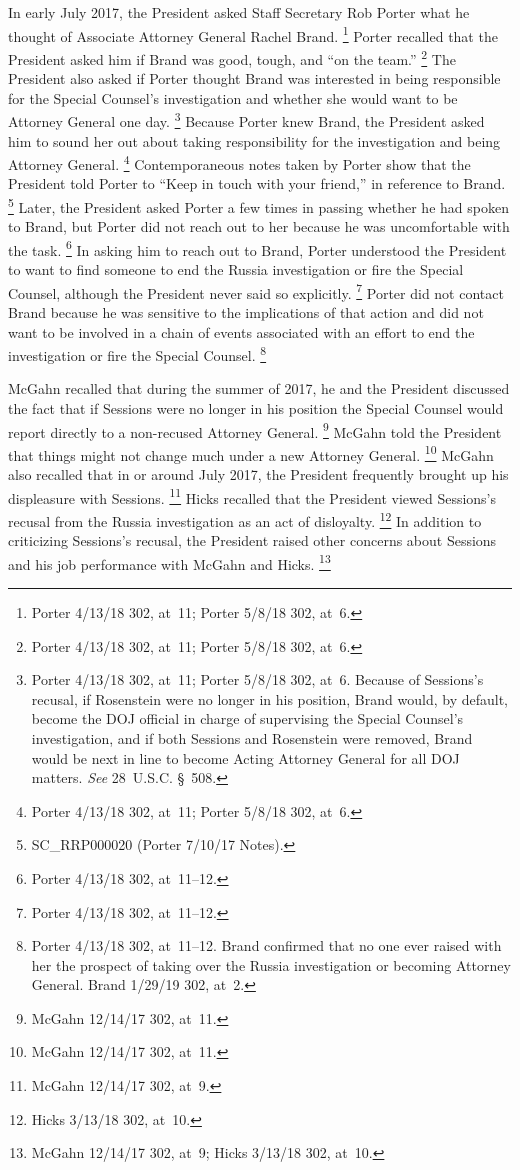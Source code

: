 In early July 2017, the President asked Staff Secretary Rob Porter what he thought of Associate Attorney General Rachel Brand.%
\footnote{Porter 4/13/18 302, at~11;
Porter 5/8/18 302, at~6.}
Porter recalled that the President asked him if Brand was good, tough, and ``on the team.''%
\footnote{Porter 4/13/18 302, at~11;
Porter 5/8/18 302, at~6.}
The President also asked if Porter thought Brand was interested in being responsible for the Special Counsel's investigation and whether she would want to be Attorney General one day.%
\footnote{Porter 4/13/18 302, at~11;
Porter 5/8/18 302, at~6.
Because of Sessions's recusal, if Rosenstein were no longer in his position, Brand would, by default, become the DOJ official in charge of supervising the Special Counsel's investigation, and if both Sessions and Rosenstein were removed, Brand would be next in line to become Acting Attorney General for all DOJ matters.
\textit{See} 28~U.S.C. \S~508.}
Because Porter knew Brand, the President asked him to sound her out about taking responsibility for the investigation and being Attorney General.%
\footnote{Porter 4/13/18 302, at~11;
Porter 5/8/18 302, at~6.}
Contemporaneous notes taken by Porter show that the President told Porter to ``Keep in touch with your friend,'' in reference to Brand.%
\footnote{SC\_RRP000020 (Porter 7/10/17 Notes).}
Later, the President asked Porter a few times in passing whether he had spoken to Brand, but Porter did not reach out to her because he was uncomfortable with the task.%
\footnote{Porter 4/13/18 302, at~11--12.}
In asking him to reach out to Brand, Porter understood the President to want to find someone to end the Russia investigation or fire the Special Counsel, although the President never said so explicitly.%
\footnote{Porter 4/13/18 302, at~11--12.}
Porter did not contact Brand because he was sensitive to the implications of that action and did not want to be involved in a chain of events associated with an effort to end the investigation or fire the Special Counsel.%
\footnote{Porter 4/13/18 302, at~11--12.
Brand confirmed that no one ever raised with her the prospect of taking over the Russia investigation or becoming Attorney General.
Brand 1/29/19 302, at~2.}

McGahn recalled that during the summer of 2017, he and the President discussed the fact that if Sessions were no longer in his position the Special Counsel would report directly to a non-recused Attorney General.%
\footnote{McGahn 12/14/17 302, at~11.}
McGahn told the President that things might not change much under a new Attorney General.%
\footnote{McGahn 12/14/17 302, at~11.}
McGahn also recalled that in or around July 2017, the President frequently brought up his displeasure with Sessions.%
\footnote{McGahn 12/14/17 302, at~9.}
Hicks recalled that the President viewed Sessions's recusal from the Russia investigation as an act of disloyalty.%
\footnote{Hicks 3/13/18 302, at~10.}
In addition to criticizing Sessions's recusal, the President raised other concerns about Sessions and his job performance with McGahn and Hicks.%
\footnote{McGahn 12/14/17 302, at~9;
Hicks 3/13/18 302, at~10.}

